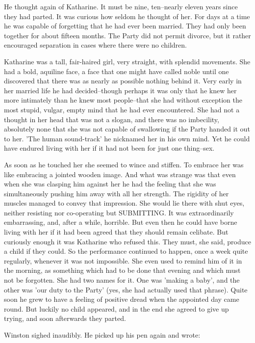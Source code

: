 \documentclass{article}
\begin{document}
He thought again of Katharine. It must be nine, ten--nearly eleven years
since they had parted. It was curious how seldom he thought of her. For
days at a time he was capable of forgetting that he had ever been married.
They had only been together for about fifteen months. The Party did not
permit divorce, but it rather encouraged separation in cases where there
were no children.

Katharine was a tall, fair-haired girl, very straight, with splendid
movements. She had a bold, aquiline face, a face that one might have called
noble until one discovered that there was as nearly as possible nothing
behind it. Very early in her married life he had decided--though perhaps
it was only that he knew her more intimately than he knew most people--that
she had without exception the most stupid, vulgar, empty mind that he had
ever encountered. She had not a thought in her head that was not a slogan,
and there was no imbecility, absolutely none that she was not capable of
swallowing if the Party handed it out to her. 'The human sound-track' he
nicknamed her in his own mind. Yet he could have endured living with her
if it had not been for just one thing--sex.

As soon as he touched her she seemed to wince and stiffen. To embrace her
was like embracing a jointed wooden image. And what was strange was that
even when she was clasping him against her he had the feeling that she
was simultaneously pushing him away with all her strength. The rigidity
of her muscles managed to convey that impression. She would lie there
with shut eyes, neither resisting nor co-operating but SUBMITTING. It was
extraordinarily embarrassing, and, after a while, horrible. But even then
he could have borne living with her if it had been agreed that they should
remain celibate. But curiously enough it was Katharine who refused this.
They must, she said, produce a child if they could. So the performance
continued to happen, once a week quite regularly, whenever it was not
impossible. She even used to remind him of it in the morning, as something
which had to be done that evening and which must not be forgotten. She had
two names for it. One was 'making a baby', and the other was 'our duty to
the Party' (yes, she had actually used that phrase). Quite soon he grew to
have a feeling of positive dread when the appointed day came round. But
luckily no child appeared, and in the end she agreed to give up trying,
and soon afterwards they parted.

Winston sighed inaudibly. He picked up his pen again and
wrote:
\end{document}
